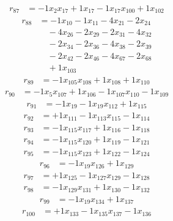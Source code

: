 \[\begin{aligned}
r_{87} &= - 1 x_{2} x_{17} + 1 x_{17} - 1 x_{17} x_{100} + 1 x_{102}
\end{aligned}\]
\[\begin{aligned}
r_{88} &= - 1 x_{10} - 1 x_{11} - 4 x_{21} - 2 x_{24} \\
 &\quad - 4 x_{26} - 2 x_{29} - 2 x_{31} - 4 x_{32} \\
 &\quad - 2 x_{34} - 2 x_{36} - 4 x_{38} - 2 x_{39} \\
 &\quad - 2 x_{42} - 2 x_{46} - 4 x_{67} - 2 x_{68} \\
 &\quad + 1 x_{103}
\end{aligned}\]
\[\begin{aligned}
r_{89} &= - 1 x_{105} x_{108} + 1 x_{108} + 1 x_{110}
\end{aligned}\]
\[\begin{aligned}
r_{90} &= - 1 x_{5} x_{107} + 1 x_{106} - 1 x_{107} x_{110} - 1 x_{109}
\end{aligned}\]
\[\begin{aligned}
r_{91} &= - 1 x_{19} - 1 x_{19} x_{112} + 1 x_{115}
\end{aligned}\]
\[\begin{aligned}
r_{92} &= + 1 x_{111} - 1 x_{113} x_{115} - 1 x_{114}
\end{aligned}\]
\[\begin{aligned}
r_{93} &= - 1 x_{115} x_{117} + 1 x_{116} - 1 x_{118}
\end{aligned}\]
\[\begin{aligned}
r_{94} &= - 1 x_{115} x_{120} + 1 x_{119} - 1 x_{121}
\end{aligned}\]
\[\begin{aligned}
r_{95} &= - 1 x_{115} x_{123} + 1 x_{122} - 1 x_{124}
\end{aligned}\]
\[\begin{aligned}
r_{96} &= - 1 x_{19} x_{126} + 1 x_{129}
\end{aligned}\]
\[\begin{aligned}
r_{97} &= + 1 x_{125} - 1 x_{127} x_{129} - 1 x_{128}
\end{aligned}\]
\[\begin{aligned}
r_{98} &= - 1 x_{129} x_{131} + 1 x_{130} - 1 x_{132}
\end{aligned}\]
\[\begin{aligned}
r_{99} &= - 1 x_{19} x_{134} + 1 x_{137}
\end{aligned}\]
\[\begin{aligned}
r_{100} &= + 1 x_{133} - 1 x_{135} x_{137} - 1 x_{136}
\end{aligned}\]
